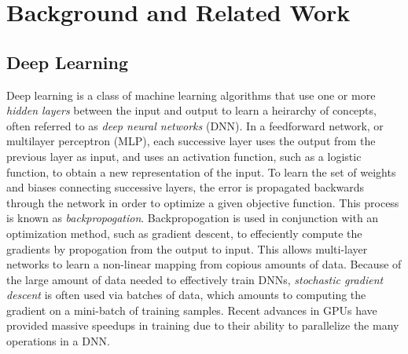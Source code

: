 \documentclass{article}
\begin{document}
\section{Background and Related Work}

\subsection{Deep Learning}
Deep learning is a class of machine learning algorithms that use one or more \textit{hidden layers} between the input and output
to learn a heirarchy of concepts, often referred to as \textit{deep neural networks} (DNN).
In a feedforward network, or multilayer perceptron (MLP), each successive layer uses the output
from the previous layer as input, and uses an activation function, such as a logistic function, to obtain a new representation of the input. To
learn the set of weights and biases connecting successive layers, the error is propagated backwards through the network in order to optimize a
given objective function. This process is known as \textit{backpropogation}. Backpropogation is used in conjunction with an optimization method,
such as gradient descent, to effeciently compute the gradients by propogation from the output to input. This allows multi-layer networks to learn
a non-linear mapping from copious amounts of data. Because of the large amount of data needed to effectively train DNNs, \textit{stochastic gradient descent}
is often used via batches of data, which amounts to computing the gradient on a mini-batch of training samples. Recent advances in GPUs have
provided massive speedups in training due to their ability to parallelize the many operations in a DNN. \newline

\end{document}
